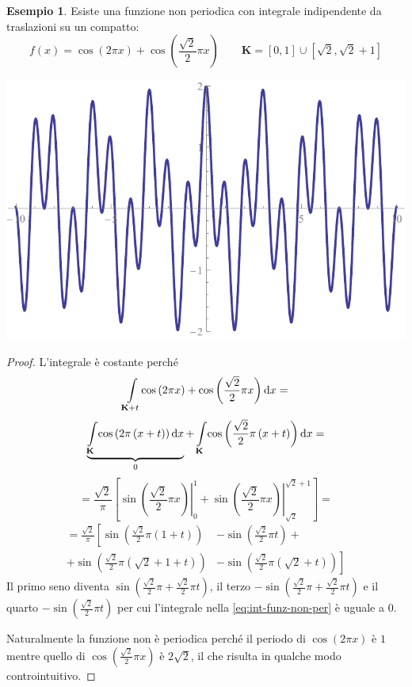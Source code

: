 \documentclass[12pt]{article}
\newcommand\ins[1]{\mathbf #1}
\newcommand\intes[2]{\int\limits_{#1}\!#2\text dx}
\theoremstyle{definition}
\newtheorem{esem}{Esempio}
\begin{document}
\begin{esem}Esiste una funzione non periodica con integrale indipendente da traslazioni su un compatto:
\begin{equation*}
f(x)=\cos\left(2\pi x\right)+\cos\left(\frac{\sqrt2}2\pi x\right)\qquad\ins K=\left[0,1\right]\cup\left[\sqrt2,\sqrt2+1\right]
\end{equation*}
\end{esem}
\begin{center}
\includegraphics*[scale=0.8]{ex4.pdf}
\end{center}
\begin{proof}L'integrale è costante perché
\begin{equation}\label{eq:int-funz-non-per}
\intes{\ins K+t}{\cos\left(2\pi x\right)+\cos\left(\frac{\sqrt2}2\pi x\right)}=
\end{equation}
\begin{equation*}
\underbrace{\intes{\ins K}{\cos\left(2\pi\left(x+t\right)\right)}}_0+\intes{\ins K}{\cos\left(\frac{\sqrt2}2\pi\left(x+t\right)\right)}=
\end{equation*}
\begin{equation*}
=\frac{\sqrt2}\pi\left[\left.\sin\left(\frac{\sqrt2}2\pi x\right)\right|_0^1+\left.\sin\left(\frac{\sqrt2}2\pi x\right)\right|_{\sqrt2}^{\sqrt2+1}\right]=
\end{equation*}
\begin{equation*}\begin{split}
=\frac{\sqrt2}\pi\left[\sin\left(\frac{\sqrt2}2\pi\left(1+t\right)\right)\right.&
-\sin\left(\frac{\sqrt2}2\pi t\right)+\\
+\sin\left(\frac{\sqrt2}2\pi\left(\sqrt2+1+t\right)\right)&
\left.-\sin\left(\frac{\sqrt2}2\pi\left(\sqrt2+t\right)\right)\right]
\end{split}\end{equation*}
Il primo seno diventa $\sin\left(\frac{\sqrt2}2\pi+\frac{\sqrt2}2\pi t\right)$, il terzo $-\sin\left(\frac{\sqrt2}2\pi+\frac{\sqrt2}2\pi t\right)$ e il quarto $-\sin\left(\frac{\sqrt2}2\pi t\right)$ per cui l'integrale nella \eqref{eq:int-funz-non-per} è uguale a $0$.
 
Naturalmente la funzione non è periodica perché il periodo di $\cos(2\pi x)$ è $1$ mentre quello di $\cos\left(\frac{\sqrt2}2\pi x\right)$ è $2\sqrt2$, il che risulta in qualche modo controintuitivo.
\end{proof}
\end{document}
